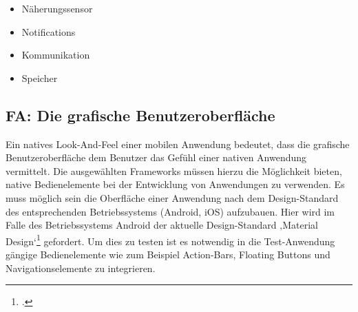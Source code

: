 \begin{itemize}
\item Näherungssensor

\item Notifications

\item Kommunikation

\item Speicher

\end{itemize}

\subsection*{FA: Die grafische Benutzeroberfläche}

Ein natives Look-And-Feel einer mobilen Anwendung bedeutet, dass die grafische Benutzeroberfläche dem Benutzer das Gefühl einer nativen Anwendung vermittelt. Die ausgewählten Frameworks müssen hierzu die Möglichkeit bieten, native Bedienelemente bei der Entwicklung von Anwendungen zu verwenden. Es muss möglich sein die Oberfläche einer Anwendung nach dem Design-Standard des entsprechenden Betriebssystems (Android, iOS) aufzubauen. Hier wird im Falle des Betriebssystems Android der aktuelle Design-Standard ‚Material Design‘\footcite{MaterialDesignHP} gefordert. Um dies zu testen ist es notwendig in die Test-Anwendung gängige Bedienelemente wie zum Beispiel Action-Bars, Floating Buttons und Navigationselemente zu integrieren.

